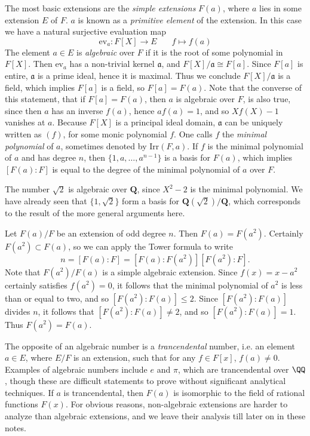 The most basic extensions are the {\it simple extensions} $F(a)$, where $a$ lies in some extension $E$ of $F$. $a$ is known as a {\it primitive element} of the extension. In this case we have a natural surjective evaluation map
%
\[ \text{ev}_a: F[X] \to E\ \ \ \ \ \ \ \ f \mapsto f(a) \]
%
The element $a \in E$ is {\it algebraic} over $F$ if it is the root of some polynomial in $F[X]$. Then $\text{ev}_a$ has a non-trivial kernel $\mathfrak{a}$, and $F[X]/\mathfrak{a} \cong F[a]$. Since $F[a]$ is entire, $\mathfrak{a}$ is a prime ideal, hence it is maximal. Thus we conclude $F[X]/\mathfrak{a}$ is a field, which implies $F[a]$ is a field, so $F[a] = F(a)$. Note that the converse of this statement, that if $F[a] = F(a)$, then $a$ is algebraic over $F$, is also true, since then $a$ has an inverse $f(a)$, hence $af(a) = 1$, and so $Xf(X) - 1$ vanishes at $a$. Because $F[X]$ is a principal ideal domain, $\mathfrak{a}$ can be uniquely written as $(f)$, for some monic polynomial $f$. One calls $f$ the {\it minimal polynomial} of $a$, sometimes denoted by $\text{Irr}(F,a)$. If $f$ is the minimal polynomial of $a$ and has degree $n$, then $\{ 1, a, \dots, a^{n-1} \}$ is a basis for $F(a)$, which implies $[F(a): F]$ is equal to the degree of the minimal polynomial of $a$ over $F$.

\begin{example}
	The number $\sqrt{2}$ is algebraic over $\mathbf{Q}$, since $X^2 - 2$ is the minimal polynomial. We have already seen that $\{ 1, \sqrt{2} \}$ form a basis for $\mathbf{Q}(\sqrt{2})/\mathbf{Q}$, which corresponds to the result of the more general arguments here.
\end{example}

\begin{example}
	Let $F(a)/F$ be an extension of odd degree $n$. Then $F(a) = F(a^2)$. Certainly $F(a^2) \subset F(a)$, so we can apply the Tower formula to write
	\[ n = [F(a): F] = [F(a): F(a^2)] [ F(a^2): F]. \]
	Note that $F(a^2) / F(a)$ is a simple algebraic extension. Since $f(x) = x - a^2$ certainly satisfies $f(a^2) = 0$, it follows that the minimal polynomial of $a^2$ is less than or equal to two, and so $[F(a^2): F(a)] \leq 2$. Since $[F(a^2): F(a)]$ divides $n$, it follows that $[F(a^2): F(a)] \neq 2$, and so $[F(a^2): F(a)] = 1$. Thus $F(a^2) = F(a)$.
\end{example}

\begin{remark}
	The opposite of an algebraic number is a {\it trancendental} number, i.e. an element $a \in E$, where $E/F$ is an extension, such that for any $f \in F[x]$, $f(a) \neq 0$. Examples of algebraic numbers include $e$ and $\pi$, which are trancendental over $\QQ$, though these are difficult statements to prove without significant analytical techniques. If $a$ is trancendental, then $F(a)$ is isomorphic to the field of rational functions $F(x)$. For obvious reasons, non-algebraic extensions are harder to analyze than algebraic extensions, and we leave their analysis till later on in these notes.
\end{remark}

